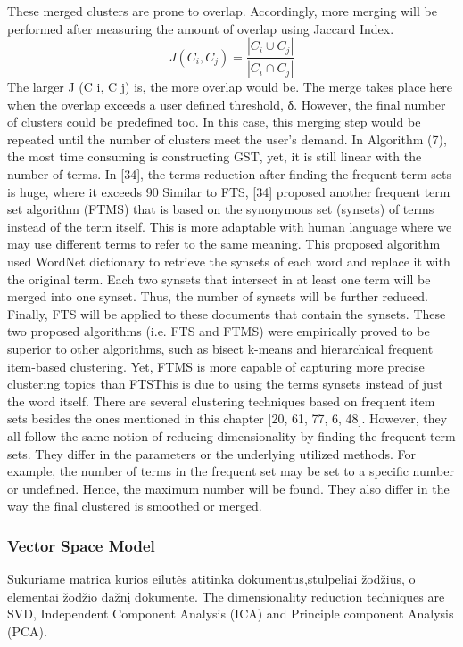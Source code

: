 \documentclass{VUMIFInfKursinis}
\begin{document}
These merged clusters are prone to overlap. Accordingly, more merging will be performed after measuring the amount of overlap using Jaccard Index.
\begin{equation}
	J(C_i,C_j) = \frac{|C_i \cup C_j|}{|C_i \cap C_j|}
\end{equation}
The larger J (C i, C j) is, the more overlap would be. The merge takes place here when the overlap exceeds a user defined threshold, δ. However, the final number of clusters could be predefined too. In this case, this merging step would be repeated until the number of clusters meet the user’s demand.
In Algorithm (7), the most time consuming is constructing GST, yet, it is still linear with the number of terms. In [34], the terms reduction after finding the frequent term sets is huge, where it exceeds 90%
Similar to FTS, [34] proposed another frequent term set algorithm (FTMS) that is based on the synonymous set (synsets) of terms instead of the term itself. This is more adaptable with human language where we may use different terms to refer to the same meaning.  This proposed algorithm used WordNet dictionary to retrieve the synsets of each word and replace it with the original term. Each two synsets that intersect in at least one term will be merged into one synset. Thus, the number of synsets will be further reduced. Finally, FTS will be applied to these documents that contain the synsets.
These two proposed algorithms (i.e. FTS and FTMS) were empirically proved to be superior to other algorithms, such as bisect k-means and hierarchical frequent item-based clustering. Yet, FTMS is more capable of capturing more precise clustering topics than FTS\. This is due to using the terms synsets instead of just the word itself.
There are several clustering techniques based on frequent item sets besides the ones mentioned in this chapter [20, 61, 77, 6, 48]. However, they all follow the same notion of reducing dimensionality by finding the frequent term sets. They differ in the parameters or the underlying utilized methods. For example, the number of terms in the frequent set may be set to a specific number or undefined. Hence, the maximum number will be found. They also differ in the way the final clustered is smoothed or merged.
\subsubsection{Vector Space Model}
Sukuriame matrica kurios eilutės atitinka dokumentus,stulpeliai žodžius, o elementai žodžio dažnį dokumente.
The dimensionality reduction techniques are SVD, Independent Component Analysis (ICA) and Principle component Analysis (PCA). 
\end{document}
